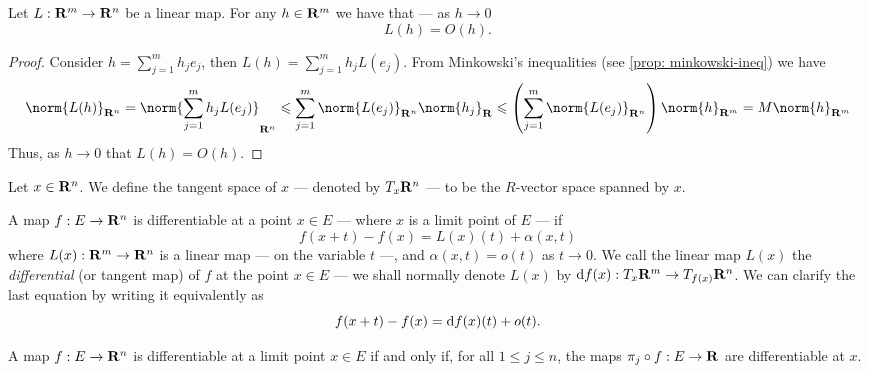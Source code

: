\begin{proposition}\label{prop: linear-big-oh}
  Let \(L: \mathbf{R}^m \to \mathbf{R}^n\) be a linear map. For any \(h \in \mathbf{R}^m\) we have that
  --- as \(h \to 0\)
  \[
    L(h) = O(h).
  \]
\end{proposition}

\begin{proof}
  Consider \(h = \sum_{j = 1}^m h_j e_j\), then \(L(h) = \sum_{j=1}^m h_j
  L(e_j)\). From Minkowski's inequalities (see \cref{prop: minkowski-ineq}) we
  have
  \[
    \norm{L(h)}_{\R^n} = \norm{\sum_{j=1}^m h_j L(e_j)}_{\R^n}
    \leq \sum_{j=1}^m \norm{L(e_j)}_{\R^n} \norm{h_j}_\R
    \leq \left(\sum_{j=1}^m \norm{L(e_j)}_{\R^n}\right) \norm{h}_{\R^m}
    = M \norm{h}_{\R^m}
  \]
  Thus, as \(h \to 0\) that \(L(h) = O(h)\).
\end{proof}

\begin{definition}
  Let \(x \in \mathbf{R}^n\). We define the tangent space of \(x\) --- denoted by
  \(T_x\mathbf{R}^n\) --- to be the \(R\)-vector space spanned by \(x\).
\end{definition}

\begin{definition}[Differentiable]\label{def: diff-several}
  A map \(f: E \to \mathbf{R}^n\) is differentiable at a point \(x \in E\) --- where
  \(x\) is a limit point of \(E\) --- if
  \begin{equation}\label{eq: diff-several-1}
    f(x + t) - f(x) = L(x)(t) + \alpha(x, t)
  \end{equation}
  where \(L(x): \mathbf{R}^m \to \mathbf{R}^n\) is a linear map --- on the variable \(t\) ---,
  and \(\alpha(x, t) = o(t)\) as \(t \to 0\). We call the linear map \(L(x)\)
  the \emph{differential} (or tangent map) of \(f\) at the point \(x \in E\) ---
  we shall normally denote \(L(x)\) by \(\mathrm{d} f(x): T_x\mathbf{R}^m \to T_{f(x)}\mathbf{R}^n\).
  We can clarify the last equation by writing it equivalently as
  \begin{equation}\label{eq: diff-several-2}
    f(x + t) - f(x) = \mathrm{d} f(x)(t) + o(t).
  \end{equation}
\end{definition}

\begin{proposition}
  A map \(f: E \to \mathbf{R}^n\) is differentiable at a limit point \(x \in E\) if and
  only if, for all \(1 \leq j \leq n\), the maps \(\pi_j \circ f: E \to \mathbf{R}\) are
  differentiable at \(x\).
\end{proposition}

